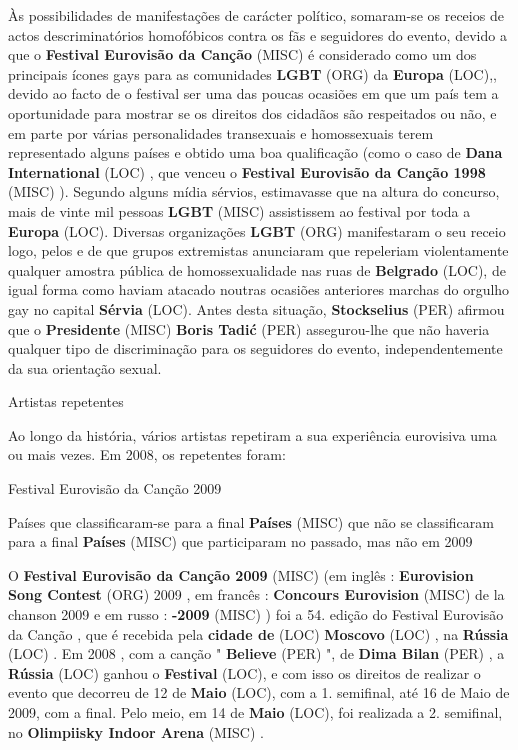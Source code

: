 \documentclass[12pt,a4paper]{article}
\begin{document}
Às possibilidades de manifestações de carácter político, somaram-se os receios de actos descriminatórios homofóbicos contra os fãs e seguidores do evento, devido a que o \textbf{Festival Eurovisão da Canção} (MISC) é considerado como um dos principais ícones gays para as comunidades \textbf{LGBT} (ORG) da \textbf{Europa} (LOC),, devido ao facto de o festival ser uma das poucas ocasiões em que um país tem a oportunidade para mostrar se os direitos dos cidadãos são respeitados ou não, e em parte por várias personalidades transexuais e homossexuais terem representado alguns países e obtido uma boa qualificação (como o caso de \textbf{Dana International} (LOC) , que venceu o \textbf{Festival Eurovisão da Canção 1998} (MISC) ). Segundo alguns mídia sérvios, estimavasse que na altura do concurso, mais de vinte mil pessoas \textbf{LGBT} (MISC) assistissem ao festival por toda a \textbf{Europa} (LOC). Diversas organizações \textbf{LGBT} (ORG) manifestaram o seu receio logo, pelos e de que grupos extremistas anunciaram que repeleriam violentamente qualquer amostra pública de homossexualidade nas ruas de \textbf{Belgrado} (LOC), de igual forma como haviam atacado noutras ocasiões anteriores marchas do orgulho gay no capital \textbf{Sérvia} (LOC). Antes desta situação, \textbf{Stockselius} (PER) afirmou que o \textbf{Presidente} (MISC) \textbf{Boris Tadić} (PER) assegurou-lhe que não haveria qualquer tipo de discriminação para os seguidores do evento, independentemente da sua orientação sexual.



Artistas repetentes

Ao longo da história, vários artistas repetiram a sua experiência eurovisiva uma ou mais vezes. Em 2008, os repetentes foram:



Festival Eurovisão da Canção 2009



Países que classificaram-se para a final \textbf{Países} (MISC) que não se classificaram para a final \textbf{Países} (MISC) que participaram no passado, mas não em 2009

O \textbf{Festival Eurovisão da Canção 2009} (MISC) (em inglês : \textbf{Eurovision Song Contest} (ORG) 2009 , em francês : \textbf{Concours Eurovision} (MISC) de la chanson 2009 e em russo : \textbf{  -2009} (MISC) ) foi a 54. edição do Festival Eurovisão da Canção , que é recebida pela \textbf{cidade de} (LOC) \textbf{Moscovo} (LOC) , na \textbf{Rússia} (LOC) . Em 2008 , com a canção " \textbf{Believe} (PER) ", de \textbf{Dima Bilan} (PER) , a \textbf{Rússia} (LOC) ganhou o \textbf{Festival} (LOC), e com isso os direitos de realizar o evento que decorreu de 12 de \textbf{Maio} (LOC), com a 1. semifinal, até 16 de Maio de 2009, com a final. Pelo meio, em 14 de \textbf{Maio} (LOC), foi realizada a 2. semifinal, no \textbf{Olimpiisky Indoor Arena} (MISC) .
\end{document}
